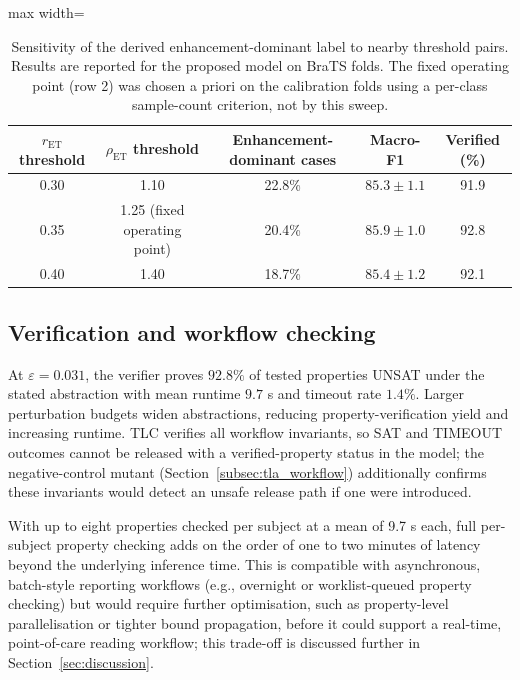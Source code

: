 \documentclass[preprint,11pt]{elsarticle}
\newcommand{\eps}{\varepsilon}
\begin{document}
\begin{table}[H]
\centering
\caption{Sensitivity of the derived enhancement-dominant label to nearby threshold pairs. Results are reported for the proposed model on BraTS folds. The fixed operating point (row 2) was chosen a priori on the calibration folds using a per-class sample-count criterion, not by this sweep.}
\label{tab:threshold_sensitivity}
\scriptsize
\begin{adjustbox}{max width=\textwidth}
\begin{tabular}{ccccc}
\toprule
$r_{\mathrm{ET}}$ threshold & $\rho_{\mathrm{ET}}$ threshold & \textbf{Enhancement-dominant cases} & \textbf{Macro-F1} & \textbf{Verified (\%)} \\
\midrule
0.30 & 1.10 & 22.8\% & $85.3\pm1.1$ & 91.9 \\
0.35 & 1.25 (fixed operating point) & 20.4\% & $85.9\pm1.0$ & 92.8 \\
0.40 & 1.40 & 18.7\% & $85.4\pm1.2$ & 92.1 \\
\bottomrule
\end{tabular}
\end{adjustbox}
\end{table}

\subsection{Verification and workflow checking}

At $\eps=0.031$, the verifier proves $92.8\%$ of tested properties UNSAT under the stated abstraction with mean runtime $9.7$ s and timeout rate $1.4\%$. Larger perturbation budgets widen abstractions, reducing property-verification yield and increasing runtime. TLC verifies all workflow invariants, so SAT and TIMEOUT outcomes cannot be released with a verified-property status in the model; the negative-control mutant (Section~\ref{subsec:tla_workflow}) additionally confirms these invariants would detect an unsafe release path if one were introduced.

With up to eight properties checked per subject at a mean of 9.7 s each, full per-subject property checking adds on the order of one to two minutes of latency beyond the underlying inference time. This is compatible with asynchronous, batch-style reporting workflows (e.g., overnight or worklist-queued property checking) but would require further optimisation, such as property-level parallelisation or tighter bound propagation, before it could support a real-time, point-of-care reading workflow; this trade-off is discussed further in Section~\ref{sec:discussion}.
\end{document}
